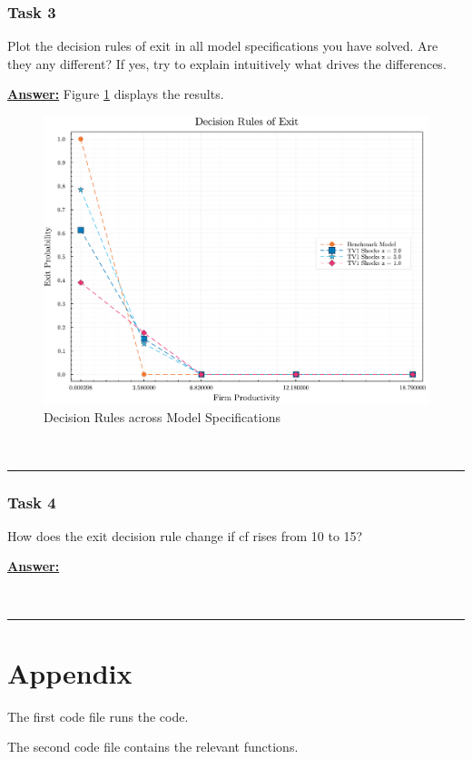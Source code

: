 \documentclass{article} %
\theoremstyle{definition}
\newenvironment{solution}[1][Answer]{\begin{singlespace}\underline{\textbf{#1:}}\quad }{\ \rule{0.3em}{0.3em}\end{singlespace}} %
\begin{document}
\subsubsection*{Task 3}
Plot the decision rules of exit in all model specifications you have solved. Are they any different? If yes, try to explain intuitively what drives the differences.
\begin{solution}
Figure \ref{T3} displays the results.
	\begin{figure}[htbp]
	\begin{center}
	\includegraphics[scale=.35]{Figures/decision_rules.pdf}
	\caption{Decision Rules across Model Specifications}
	\label{T3}
	\end{center}
	\end{figure}
\end{solution}

\subsubsection*{Task 4}
How does the exit decision rule change if cf rises from 10 to 15?

\begin{solution}

\end{solution}

\newpage
	\section*{Appendix}
 	The first code file runs the code.
	
 	The second code file contains the relevant functions.
\end{document}
